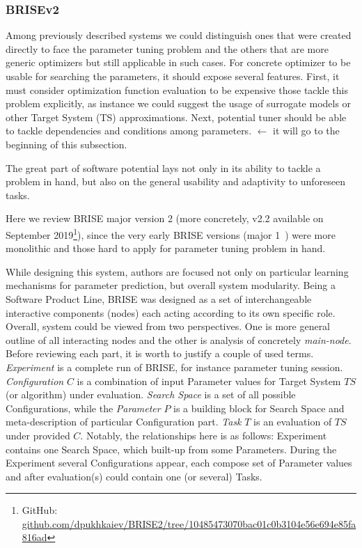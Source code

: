 \subsubsection{BRISEv2~\cite{brise2spl}}
Among previously described systems we could distinguish ones that were created directly to face the parameter tuning problem and the others that are more generic optimizers but still applicable in such cases.
For concrete optimizer to be usable for searching the parameters, it should expose several features. First, it must consider optimization function evaluation to be expensive those tackle this problem explicitly, as instance we could suggest the usage of surrogate models or other Target System (TS) approximations. Next, potential tuner should be able to tackle dependencies and conditions among parameters. $\leftarrow$ it will go to the beginning of this subsection.


The great part of software potential lays not only in its ability to tackle a problem in hand, but also on the general usability and adaptivity to unforeseen tasks. 

Here we review BRISE major version 2 (more concretely, v2.2 available on September 2019\footnote[1]{GitHub: \url{github.com/dpukhkaiev/BRISE2/tree/10485473070bac01c0b3104e56e694e85fa816ad}}), since the very early BRISE versions (major 1~\cite{brise1monolite}) were more monolithic and those hard to apply for parameter tuning problem in hand.

While designing this system, authors are focused not only on particular learning mechanisms for parameter prediction, but overall system modularity.
Being a Software Product Line, BRISE was designed as a set of interchangeable interactive components (nodes) each acting according to its own specific role. 
Overall, system could be viewed from two perspectives. One is more general outline of all interacting nodes and the other is analysis of concretely \textit{main-node}.
Before reviewing each part, it is worth to justify a couple of used terms. \textit{Experiment} is a complete run of BRISE, for instance parameter tuning session. \textit{Configuration} $C$ is a combination of input Parameter values for Target System $TS$ (or algorithm) under evaluation. \textit{Search Space} is a set of all possible Configurations, while the \textit{Parameter} $P$ is a building block for Search Space and meta-description of particular Configuration part. \textit{Task} $T$ is an evaluation of $TS$ under provided $C$. Notably, the relationships here is as follows: Experiment contains one Search Space, which built-up from some Parameters. During the Experiment several Configurations appear, each compose set of Parameter values and after evaluation(s) could contain one (or several) Tasks.

